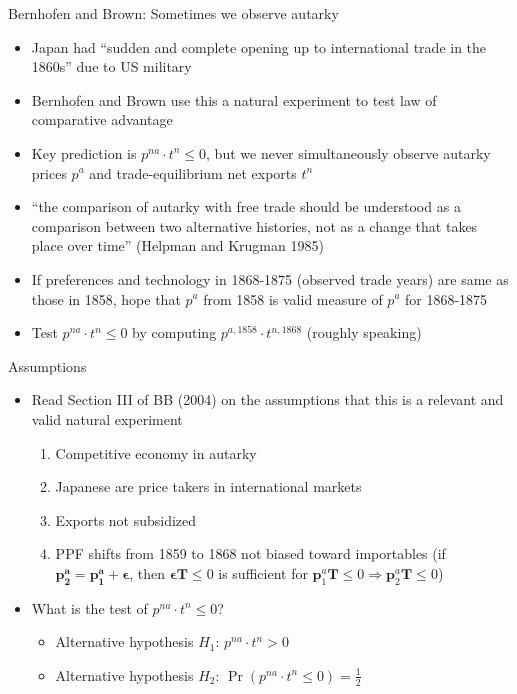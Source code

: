 \documentclass[10pt,notes=hide]{beamer}
\begin{document}
\begin{frame}{Bernhofen and Brown: Sometimes we observe autarky}
\begin{itemize}
	\item Japan had ``sudden and complete opening up to international trade in the 1860s'' due to US military
	\item Bernhofen and Brown use this a natural experiment to test law of comparative advantage
	\item Key prediction is $p^{na} \cdot t^n \leq 0$, but we never simultaneously observe autarky prices $p^a$ and trade-equilibrium net exports $t^n$
	\item ``the comparison of autarky with free trade should be understood as a comparison between two alternative histories, not as a change that takes place over time'' (Helpman and Krugman 1985)
	\item If preferences and technology in 1868-1875 (observed trade years) are same as those in 1858, hope that $p^a$ from 1858 is valid measure of $p^a$ for 1868-1875
	\item Test $p^{na} \cdot t^n \leq 0$ by computing $p^{a,1858} \cdot t^{n,1868}$ (roughly speaking)
\end{itemize}
\end{frame}
\begin{frame}{Assumptions}
\begin{itemize}
	\item Read Section III of BB (2004) on the assumptions that this is a relevant and valid natural experiment
	\begin{enumerate}
		\item Competitive economy in autarky
		\item Japanese are price takers in international markets
		\item Exports not subsidized
		\item PPF shifts from 1859 to 1868 not biased toward importables (if $\mathbf{p_2^a} = \mathbf{p_1^a} + \mathbf{\epsilon}$, then $\mathbf{\epsilon} \mathbf{T} \leq 0$ is sufficient for $\mathbf{p}_1^a \mathbf{T}\leq 0 \Rightarrow \mathbf{p}_2^a \mathbf{T}\leq 0$)
	\end{enumerate}
	\item What is the test of $p^{na} \cdot t^n \leq 0$?
	\begin{itemize}
		\item Alternative hypothesis $H_1$: $p^{na} \cdot t^n > 0$
		\item Alternative hypothesis $H_2$: $\Pr\left(p^{na} \cdot t^n \leq 0\right)=\frac{1}{2}$
	\end{itemize}
\end{itemize}
\end{frame}
\end{document}
